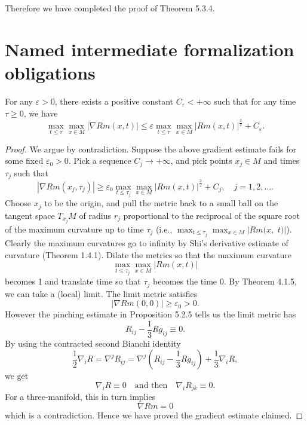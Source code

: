 Therefore we have completed the proof of Theorem 5.3.4.
\endproof


\newpage

\section{Named intermediate formalization obligations}

\begin{lemma}
  \label{lem:cz-three-dimensional-pinching-curvature-gradient}
For any $\varepsilon>0$, there exists a positive
constant $C_\varepsilon<+\infty$ such that for any time $\tau\ge
0$, we have
$$
\max_{t\le\tau}\max_{x\in M}|\nabla Rm(x,t)| \le \varepsilon
\max_{t\le\tau}\max_{x\in M}|Rm(x,t)|^\frac{3}{2}+C_\varepsilon.
$$

\end{lemma}
\begin{proof}
We argue by contradiction. Suppose the above gradient estimate
fails for some fixed $\varepsilon_0>0$. Pick a sequence
$C_j\rightarrow+\infty$, and pick points $x_j\in M$ and times
$\tau_j$ such that
$$
|\nabla Rm(x_j,\tau_j)|\ge\varepsilon_0\max_{t\le\tau_j}
\max_{x\in M}|Rm(x,t)|^\frac{3}{2}+C_j,\quad j=1,2,\ldots.
$$
Choose $x_j$ to be the origin, and pull the metric back to a small
ball on the tangent space $T_{x_j}M$ of radius $r_j$ proportional
to the reciprocal of the square root of the maximum curvature up
to time $\tau_j$ (i.e., $\max_{t\le\tau_j}\max_{x\in M}|Rm(x,$
$t)|$). Clearly the maximum curvatures go to infinity by Shi's
derivative estimate of curvature (Theorem 1.4.1). Dilate the
metrics so that the maximum curvature
$$
\max_{t\le\tau_j}\max_{x\in M}|Rm(x,t)|
$$
becomes 1 and translate time so that $\tau_j$ becomes the time 0.
By Theorem 4.1.5, we can take a (local) limit. The limit metric
satisfies
$$
|\nabla Rm(0,0)|\ge \varepsilon_0>0.
$$
However the pinching estimate in Proposition 5.2.5 tells us the
limit metric has
$$
R_{ij}-\frac{1}{3}Rg_{ij}\equiv 0.
$$
By using the contracted second Bianchi identity
$$
\frac{1}{2}\nabla_iR =\nabla^jR_{ij}
=\nabla^j\left(R_{ij}-\frac{1}{3}Rg_{ij}\right)+\frac{1}{3}\nabla_iR,
$$
we get
$$
\nabla_iR\equiv0\quad \text{and then}\quad \nabla_iR_{jk}\equiv0.
$$
For a three-manifold, this in turn implies
$$
\nabla Rm=0
$$
which is a contradiction. Hence we have proved the gradient
estimate claimed.

\end{proof}

